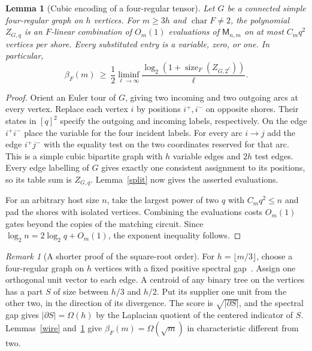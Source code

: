 \documentclass[11pt]{article}
\newtheorem{lemma}[theorem]{Lemma}
\theoremstyle{remark}
\newtheorem*{remark}{Remark}
\newcommand{\Match}{\mathsf M}
\newcommand{\sizeF}{\operatorname{size}_F}
\begin{document}
\begin{lemma}[Cubic encoding of a four-regular tensor]\label{encoding}
Let $G$ be a connected simple four-regular graph on $h$ vertices. For $m\ge3h$ and $\operatorname{char} F\ne2$, the polynomial $Z_{G,q}$ is an $F$-linear combination of $O_m(1)$ evaluations of $\Match_{n,m}$ on at most $C_mq^2$ vertices per shore. Every substituted entry is a variable, zero, or one. In particular,
\[
 \beta_F(m)\ \ge\ \frac12\liminf_{\ell\to\infty}
           \frac{\log_2(1+\sizeF(Z_{G,2^\ell}))}{\ell}.
\]
\end{lemma}
\begin{proof}
Orient an Euler tour of $G$, giving two incoming and two outgoing arcs at every vertex. Replace each vertex $i$ by positions $i^+,i^-$ on opposite shores. Their states in $[q]^2$ specify the outgoing and incoming labels, respectively. On the edge $i^+i^-$ place the variable for the four incident labels. For every arc $i\to j$ add the edge $i^+j^-$ with the equality test on the two coordinates reserved for that arc. This is a simple cubic bipartite graph with $h$ variable edges and $2h$ test edges. Every edge labelling of $G$ gives exactly one consistent assignment to its positions, so its table sum is $Z_{G,q}$. Lemma~\ref{split} now gives the asserted evaluations.

For an arbitrary host size $n$, take the largest power of two $q$ with $C_mq^2\le n$ and pad the shores with isolated vertices. Combining the evaluations costs $O_m(1)$ gates beyond the copies of the matching circuit. Since $\log_2 n=2\log_2 q+O_m(1)$, the exponent inequality follows.
\end{proof}

\begin{remark}[A shorter proof of the square-root order]
For $h=\lfloor m/3\rfloor$, choose a four-regular graph on $h$ vertices with a fixed positive spectral gap~\cite{friedman}. Assign one orthogonal unit vector to each edge. A centroid of any binary tree on the vertices has a part $S$ of size between $h/3$ and $h/2$. Put its supplier one unit from the other two, in the direction of its divergence. The score is $\sqrt{|\partial S|}$, and the spectral gap gives $|\partial S|=\Omega(h)$ by the Laplacian quotient of the centered indicator of $S$. Lemmas~\ref{wire} and~\ref{encoding} give $\beta_F(m)=\Omega(\sqrt m)$ in characteristic different from two.
\end{remark}
\end{document}

